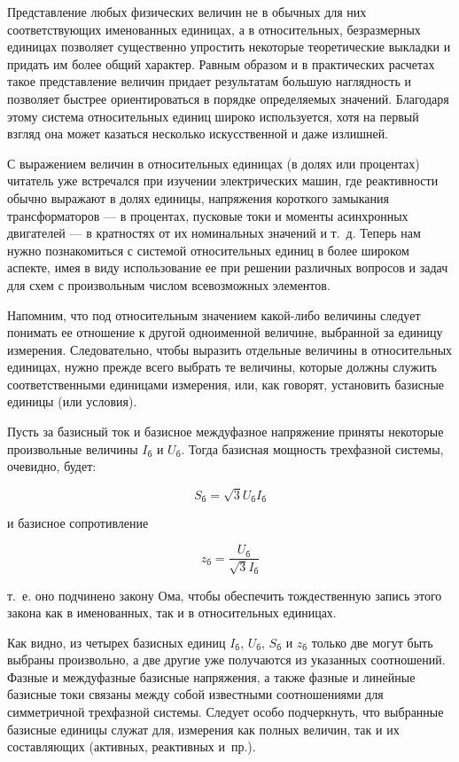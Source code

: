Представление любых физических величин не в обычных для них соответствующих именованных единицах, а в относительных, безразмерных единицах позволяет существенно упростить некоторые теоретические выкладки и придать им более общий характер. Равным образом и в практических расчетах такое представление величин придает результатам большую наглядность и позволяет быстрее ориентироваться в порядке определяемых значений. Благодаря этому система относительных единиц широко используется, хотя на первый взгляд она может казаться несколько искусственной и даже излишней.

С выражением величин в относительных единицах (в долях или процентах) читатель уже встречался при изучении электрических машин, где реактивности обычно выражают в долях единицы, напряжения короткого замыкания трансформаторов --- в процентах, пусковые токи и моменты асинхронных двигателей --- в кратностях от их номинальных значений и т.~д. Теперь нам нужно познакомиться с системой относительных единиц в более широком аспекте, имея в виду использование ее при решении различных вопросов и задач для схем с произвольным числом всевозможных элементов.

Напомним, что под относительным значением какой-либо величины следует понимать ее отношение к другой одноименной величине, выбранной за единицу измерения. Следовательно, чтобы выразить отдельные величины в относительных единицах, нужно прежде всего выбрать те величины, которые должны служить соответственными единицами измерения, или, как говорят, установить базисные единицы (или условия).

Пусть за базисный ток и базисное междуфазное напряжение приняты некоторые произвольные величины $ I_{\text{б}} $ и $ U_{\text{б}} $. Тогда базисная мощность трехфазной системы, очевидно, будет:

\begin{equation} %
	\label{eq:2-1 S_baz}
	S_{\text{б}} = \sqrt{3}U_{\text{б}}I_{\text{б}}
\end{equation}

и базисное сопротивление

\begin{equation} %
	\label{eq:2-2 z_baz}
	z_{\text{б}} = \frac{U_{\text{б}}}{\sqrt{3}I_{\text{б}}}
\end{equation}

т.~е. оно подчинено закону Ома, чтобы обеспечить тождественную запись этого закона как в именованных, так и в относительных единицах.

Как видно, из четырех базисных единиц $ I_{\text{б}} $, $ U_{\text{б}} $, $ S_{\text{б}} $ и $ z_{\text{б}} $ только две могут быть выбраны произвольно, а две другие уже получаются из указанных соотношений. Фазные и междуфазные базисные напряжения, а также фазные и линейные базисные токи связаны между собой известными соотношениями для симметричной трехфазной системы. Следует особо подчеркнуть, что выбранные базисные единицы служат для, измерения как полных величин, так и их составляющих (активных, реактивных и~пр.).

